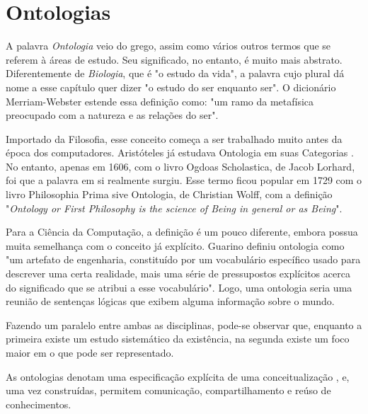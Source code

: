 \chapter{Ontologias}

\lettrine{A}{} palavra \textit{Ontologia} veio do grego, assim como vários outros termos que se referem à áreas de estudo. Seu significado, no entanto, é muito mais abstrato. Diferentemente de \textit{Biologia}, que é "o estudo da vida", a palavra cujo plural dá nome a esse capítulo quer dizer "o estudo do ser enquanto ser". O dicionário Merriam-Webster \cite{ontoMerriam} estende essa definição como: "um ramo da metafísica preocupado com a natureza e as relações do ser".

Importado da Filosofia, esse conceito começa a ser trabalhado muito antes da época dos computadores. Aristóteles já estudava Ontologia em suas Categorias \cite{ontoDahlberg}. No entanto, apenas em 1606, com o livro Ogdoas Scholastica, de Jacob Lorhard, foi que a palavra em si realmente surgiu. Esse termo ficou popular em 1729 com o livro Philosophia Prima sive Ontologia, de Christian Wolff, com a definição "\textit{Ontology or First Philosophy is the science of Being in general or as Being}".

Para a Ciência da Computação, a definição é um pouco diferente, embora possua muita semelhança com o conceito já explícito. Guarino \cite{ontoGuarino} definiu ontologia como "um artefato de engenharia, constituído por um vocabulário específico usado para descrever uma certa realidade, mais uma série de pressupostos explícitos acerca do significado que se atribui a esse vocabulário". Logo, uma ontologia seria uma reunião de sentenças lógicas que exibem alguma informação sobre o mundo.

Fazendo um paralelo entre ambas as disciplinas, pode-se observar que, enquanto a primeira existe um estudo sistemático da existência, na segunda existe um foco maior em o que pode ser representado.

As ontologias denotam uma especificação explícita de uma conceitualização \cite{ontoGruber}, e, uma vez construídas, permitem comunicação, compartilhamento e reúso de conhecimentos.
